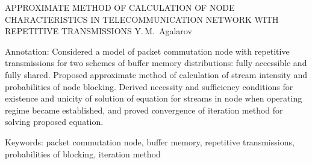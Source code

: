 APPROXIMATE METHOD OF CALCULATION OF NODE 
CHARACTERISTICS IN TELECOMMUNICATION NETWORK 
WITH REPETITIVE TRANSMISSIONS
Y.\,M.~Agalarov
  
  Annotation: Considered a model of packet commutation node with repetitive 
transmissions for two schemes of buffer memory distributions: fully accessible and 
fully shared. Proposed approximate method of calculation of stream intensity and 
probabilities of node blocking.
  Derived necessity and sufficiency conditions for existence and unicity of 
solution of equation for streams in node when operating regime became 
established, and proved convergence of iteration method for solving proposed 
equation. 
  
  Keywords: packet commutation node, buffer memory, repetitive transmissions, 
probabilities of blocking, iteration method
